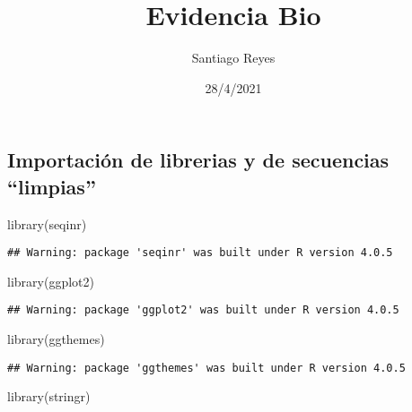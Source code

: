 \documentclass[
]{article}
\title{Evidencia Bio}
\author{Santiago Reyes}
\date{28/4/2021}
\newenvironment{Shaded}{\begin{snugshade}}{\end{snugshade}}
\newcommand{\FunctionTok}[1]{\textcolor[rgb]{0.00,0.00,0.00}{#1}}
\newcommand{\NormalTok}[1]{#1}
\newcommand{\StringTok}[1]{\textcolor[rgb]{0.31,0.60,0.02}{#1}}
\begin{document}
\maketitle

\hypertarget{importaciuxf3n-de-librerias-y-de-secuencias-limpias}{%
\subsection{Importación de librerias y de secuencias
``limpias''}\label{importaciuxf3n-de-librerias-y-de-secuencias-limpias}}

\begin{Shaded}
\begin{Highlighting}[]
\FunctionTok{library}\NormalTok{(}\StringTok{\textquotesingle{}seqinr\textquotesingle{}}\NormalTok{)}
\end{Highlighting}
\end{Shaded}

\begin{verbatim}
## Warning: package 'seqinr' was built under R version 4.0.5
\end{verbatim}

\begin{Shaded}
\begin{Highlighting}[]
\FunctionTok{library}\NormalTok{(}\StringTok{\textquotesingle{}ggplot2\textquotesingle{}}\NormalTok{)}
\end{Highlighting}
\end{Shaded}

\begin{verbatim}
## Warning: package 'ggplot2' was built under R version 4.0.5
\end{verbatim}

\begin{Shaded}
\begin{Highlighting}[]
\FunctionTok{library}\NormalTok{(ggthemes)}
\end{Highlighting}
\end{Shaded}

\begin{verbatim}
## Warning: package 'ggthemes' was built under R version 4.0.5
\end{verbatim}

\begin{Shaded}
\begin{Highlighting}[]
\FunctionTok{library}\NormalTok{(stringr)}
\end{Highlighting}
\end{Shaded}
\end{document}
